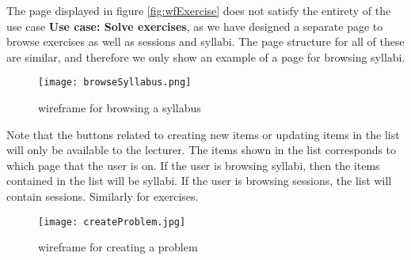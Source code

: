 The page displayed in figure \ref{fig:wfExercise} does not satisfy the entirety of the use case \textbf{Use case: Solve exercises}, as we have designed a separate page to browse exercises as well as sessions and syllabi. The page structure for all of these are similar, and therefore we only show an example of a page for browsing syllabi.
\begin{figure}[H]
    \texttt{[image: browseSyllabus.png]}
    \centering
    \caption{wireframe for browsing a syllabus}
    \label{fig:wfSyllabus}
\end{figure}
Note that the buttons related to creating new items or updating items in the list will only be available to the lecturer. The items shown in the list corresponds to which page that the user is on. If the user is browsing syllabi, then the items contained in the list will be syllabi. If the user is browsing sessions, the list will contain sessions. Similarly for exercises.
\begin{figure}[H]
	\texttt{[image: createProblem.jpg]}
	\centering
	\caption{wireframe for creating a problem}
	\label{fig:wfProblem}
\end{figure}


